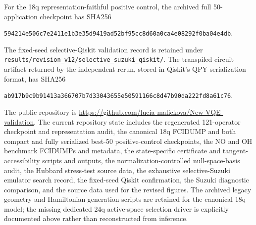 \documentclass[
 aip,
 jcp,
 amsmath,amssymb,
 preprint
]{revtex4-2}
\begin{document}
For the 18q representation-faithful positive control, the archived full 50-application checkpoint has SHA256
\begin{center}
{\small\texttt{594214e506c7e2411e1b3e35d9419ad52bf95cc8d60a0ca4e08292f0ba04e4db}.}
\end{center}
The fixed-seed selective-Qiskit validation record is retained under
\texttt{results/revision\_v12/selective\_suzuki\_qiskit/}.
The transpiled circuit artifact returned by the independent rerun, stored in Qiskit's QPY serialization format, has SHA256
\begin{center}
{\small\texttt{ab917b9c9b91413a366707b7d33043655e50591166c8d47b90da222fd8a61c76}.}
\end{center}

The public repository is
\url{https://github.com/lucia-malickova/New-VQE-validation}.
The current repository state includes the regenerated 121-operator checkpoint and representation audit, the canonical 18q FCIDUMP and both compact and fully serialized best-50 positive-control checkpoints, the NO and OH benchmark FCIDUMPs and metadata, the state-specific certificate and tangent-accessibility scripts and outputs, the normalization-controlled null-space-basis audit, the Hubbard stress-test source data, the exhaustive selective-Suzuki emulator search record, the fixed-seed Qiskit confirmation, the Suzuki diagnostic comparison, and the source data used for the revised figures.
The archived legacy geometry and Hamiltonian-generation scripts are retained for the canonical 18q model; the missing dedicated 24q active-space selection driver is explicitly documented above rather than reconstructed from inference.


\end{document}
